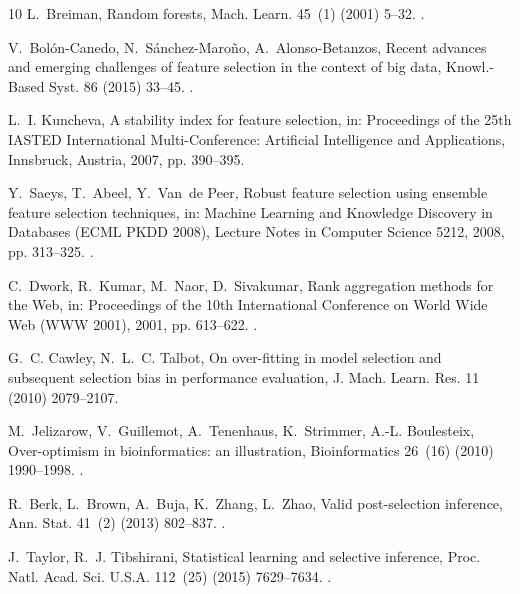 \documentclass[final,5p,twocolumn]{elsarticle}
\begin{document}
\begin{thebibliography}{10}
L.~Breiman, Random forests, Mach. Learn. 45~(1) (2001) 5--32.
\newblock \href {https://doi.org/10.1023/A:1010933404324}
  {}.

V.~Bol{\'o}n-Canedo, N.~S{\'a}nchez-Maro{\~n}o, A.~Alonso-Betanzos, Recent
  advances and emerging challenges of feature selection in the context of big
  data, Knowl.-Based Syst. 86 (2015) 33--45.
\newblock \href {https://doi.org/10.1016/j.knosys.2015.05.014}
  {}.

L.~I. Kuncheva, A stability index for feature selection, in: Proceedings of the
  25th IASTED International Multi-Conference: Artificial Intelligence and
  Applications, Innsbruck, Austria, 2007, pp. 390--395.

Y.~Saeys, T.~Abeel, Y.~Van~de Peer, Robust feature selection using ensemble
  feature selection techniques, in: Machine Learning and Knowledge Discovery in
  Databases (ECML PKDD 2008), Lecture Notes in Computer Science 5212, 2008, pp.
  313--325.
\newblock \href {https://doi.org/10.1007/978-3-540-87481-2_21}
  {}.

C.~Dwork, R.~Kumar, M.~Naor, D.~Sivakumar, Rank aggregation methods for the
  {W}eb, in: Proceedings of the 10th International Conference on World Wide Web
  (WWW 2001), 2001, pp. 613--622.
\newblock \href {https://doi.org/10.1145/371920.372165}
  {}.

G.~C. Cawley, N.~L.~C. Talbot, On over-fitting in model selection and subsequent
  selection bias in performance evaluation, J. Mach. Learn. Res.
  11 (2010) 2079--2107.

M.~Jelizarow, V.~Guillemot, A.~Tenenhaus, K.~Strimmer, A.-L. Boulesteix,
  Over-optimism in bioinformatics: an illustration, Bioinformatics 26~(16)
  (2010) 1990--1998.
\newblock \href {https://doi.org/10.1093/bioinformatics/btq323}
  {}.

R.~Berk, L.~Brown, A.~Buja, K.~Zhang, L.~Zhao, Valid post-selection inference,
  Ann. Stat. 41~(2) (2013) 802--837.
\newblock \href {https://doi.org/10.1214/12-AOS1077}
  {}.

J.~Taylor, R.~J. Tibshirani, Statistical learning and selective inference,
  Proc. Natl. Acad. Sci. U.S.A. 112~(25) (2015) 7629--7634.
\newblock \href {https://doi.org/10.1073/pnas.1507583112}
  {}.


\end{thebibliography}
\end{document}
